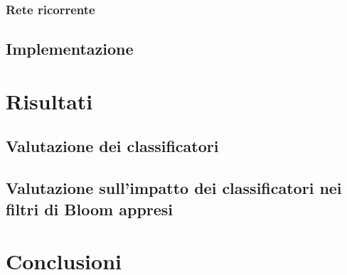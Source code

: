 \documentclass{report}
\begin{document}
\subsection{Rete ricorrente}


\section{Implementazione}

\chapter{Risultati}

\section{Valutazione dei classificatori}


\section{Valutazione sull'impatto dei classificatori nei filtri di Bloom appresi}

\chapter{Conclusioni}


\printbibliography
\end{document}

